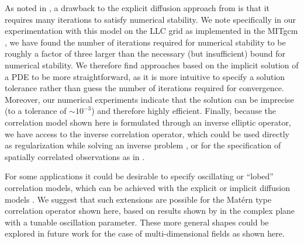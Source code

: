 As noted in \citet{mirouze_representation_2010,carrier_background-error_2010}, a
drawback to the explicit diffusion approach from
\citet{weaver_correlation_2001} is that it requires many iterations to satisfy
numerical stability.
We note specifically in our experimentation with this model on the LLC grid
as implemented in the MITgcm \citep{campin_mitgcmmitgcm_2021}, we have found
the number of iterations required for numerical stability to be roughly a factor
of three larger than the necessary (but insufficient) bound for numerical
stability.
We therefore find approaches based on the implicit solution of a PDE to be more
straightforward, as it is more intuitive to specify a solution tolerance
rather than guess the number of iterations required for convergence.
Moreover, our numerical experiments indicate that the solution can be imprecise
(to a tolerance of $\sim10^{-3}$) and therefore highly efficient.
Finally, because the correlation model shown here is formulated through an
inverse elliptic operator, we have access to the inverse correlation operator,
which could be used directly as regularization while solving an inverse problem
\citep[e.g.][]{bui-thanh_computational_2013}, or for the specification of
spatially correlated observations as in \citet{guillet_modelling_2019}.

For some applications it could be desirable to specify oscillating or ``lobed''
correlation models, which can be achieved with the explicit or implicit
diffusion models \citep{weaver_correlation_2001,weaver_diffusion_2013}.
We suggest that such extensions are possible for the Mat\'ern type correlation
operator shown here, based on results shown by \citet{RSSB:RSSB777} in the
complex plane with a tunable oscillation parameter.
These more general shapes could be explored in future work for the case of
multi-dimensional fields as shown here.
